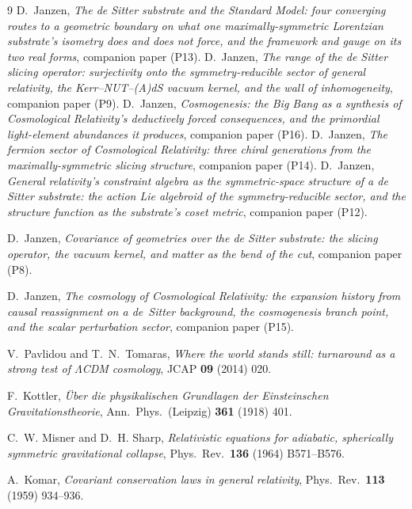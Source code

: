 \documentclass[11pt,a4paper]{article}
\theoremstyle{definition}
\begin{document}
\begin{thebibliography}{9}
 D.~Janzen, \emph{The de Sitter substrate and the Standard Model: four converging routes to a geometric boundary on what one maximally-symmetric Lorentzian substrate's isometry does and does not force, and the framework and gauge on its two real forms}, companion paper (P13).
 D.~Janzen, \emph{The range of the de Sitter slicing operator: surjectivity onto the symmetry-reducible sector of general relativity, the Kerr--NUT--(A)dS vacuum kernel, and the wall of inhomogeneity}, companion paper (P9).
 D.~Janzen, \emph{Cosmogenesis: the Big Bang as a synthesis of Cosmological Relativity's deductively forced consequences, and the primordial light-element abundances it produces}, companion paper (P16).
 D.~Janzen, \emph{The fermion sector of Cosmological Relativity: three chiral generations from the maximally-symmetric slicing structure}, companion paper (P14).
 D.~Janzen, \emph{General relativity's constraint algebra as the symmetric-space structure of a de Sitter substrate: the action Lie algebroid of the symmetry-reducible sector, and the structure function as the substrate's coset metric}, companion paper (P12).

D.~Janzen,
\emph{Covariance of geometries over the de Sitter substrate: the slicing operator, the vacuum kernel, and matter as the bend of the cut}, companion paper (P8).

 D.~Janzen, \emph{The cosmology of Cosmological Relativity: the expansion history from causal reassignment on a de~Sitter background, the cosmogenesis branch point, and the scalar perturbation sector}, companion paper (P15).

 V.~Pavlidou and T.~N.~Tomaras, \emph{Where the world stands still: turnaround as a strong test of $\Lambda$CDM cosmology}, JCAP \textbf{09} (2014) 020.

 F.~Kottler, \emph{\"Uber die physikalischen Grundlagen der Einsteinschen Gravitationstheorie}, Ann.\ Phys.\ (Leipzig) \textbf{361} (1918) 401.

C.~W. Misner and D.~H. Sharp,
\emph{Relativistic equations for adiabatic, spherically symmetric gravitational collapse},
Phys.~Rev.~\textbf{136} (1964) B571--B576.

A.~Komar,
\emph{Covariant conservation laws in general relativity},
Phys.~Rev.~\textbf{113} (1959) 934--936.


\end{thebibliography}
\end{document}
